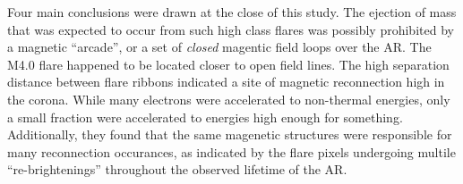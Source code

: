 \documentclass[12pt]{article}
\begin{document}
Four main conclusions were drawn at the close of this study.
The ejection of mass that was expected to occur from such high
class flares was possibly prohibited by
a magnetic ``arcade'', or a set of \emph{closed} magentic field loops over
the AR\@. The M4.0 flare happened to be located closer to open field lines.
The high separation distance between flare ribbons indicated a site
of magnetic reconnection high in the corona.
While many electrons were accelerated to non-thermal energies, only
a small fraction were accelerated to energies high enough for
something.
Additionally, they found that the same magenetic structures were
responsible for many reconnection occurances, as indicated by
the flare pixels undergoing multile ``re-brightenings'' throughout
the observed lifetime of the AR\@.




%
\end{document}

